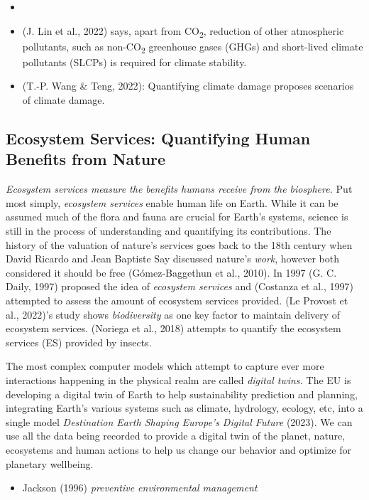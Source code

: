 \documentclass[
  letterpaper,
  DIV=11,
  numbers=noendperiod]{scrartcl}
\providecommand{\tightlist}{%
  \setlength{\itemsep}{0pt}\setlength{\parskip}{0pt}}\usepackage{longtable,booktabs,array}
\begin{document}
\begin{itemize}
\item
\item
  (J. Lin et al., 2022) says, apart from CO\textsubscript{2}, reduction
  of other atmospheric pollutants, such as non-CO\textsubscript{2}
  greenhouse gases (GHGs) and short-lived climate pollutants (SLCPs) is
  required for climate stability.
\item
  (T.-P. Wang \& Teng, 2022): Quantifying climate damage proposes
  scenarios of climate damage.
\end{itemize}

\subsection{Ecosystem Services: Quantifying Human Benefits from
Nature}\label{ecosystem-services-quantifying-human-benefits-from-nature}

\emph{Ecosystem services measure the benefits humans receive from the
biosphere.} Put most simply, \emph{ecosystem services} enable human life
on Earth. While it can be assumed much of the flora and fauna are
crucial for Earth's systems, science is still in the process of
understanding and quantifying its contributions. The history of the
valuation of nature's services goes back to the 18th century when David
Ricardo and Jean Baptiste Say discussed nature's \emph{work}, however
both considered it should be free (Gómez-Baggethun et al., 2010). In
1997 (G. C. Daily, 1997) proposed the idea of \emph{ecosystem services}
and (Costanza et al., 1997) attempted to assess the amount of ecosystem
services provided. (Le Provost et al., 2022)'s study shows
\emph{biodiversity} as one key factor to maintain delivery of ecosystem
services. (Noriega et al., 2018) attempts to quantify the ecosystem
services (ES) provided by insects.

The most complex computer models which attempt to capture ever more
interactions happening in the physical realm are called \emph{digital
twins.} The EU is developing a digital twin of Earth to help
sustainability prediction and planning, integrating Earth's various
systems such as climate, hydrology, ecology, etc, into a single model
\emph{Destination {Earth} {\textbar} {Shaping Europe}'s Digital Future}
(2023). We can use all the data being recorded to provide a digital twin
of the planet, nature, ecosystems and human actions to help us change
our behavior and optimize for planetary wellbeing.

\begin{itemize}
\tightlist
\item
  Jackson (1996) \emph{preventive environmental management}
\end{itemize}
\end{document}
